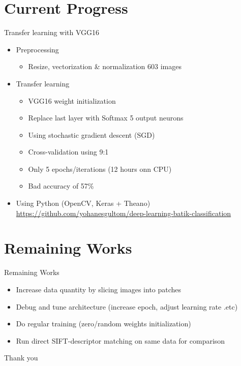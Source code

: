 \documentclass[10pt]{beamer}
\begin{document}
\section{Current Progress}

\begin{frame}{Transfer learning with VGG16}

	\begin{itemize}[<+->]
		\item Preprocessing
		\begin{itemize}
			\item Resize, vectorization \& normalization 603 images
		\end{itemize}
		\item Transfer learning
		\begin{itemize}
			\item VGG16 weight initialization
			\item Replace last layer with Softmax 5 output neurons
			\item Using stochastic gradient descent (SGD)
			\item Cross-validation using 9:1
			\item Only 5 epochs/iterations (12 hours onn CPU)
			\item Bad accuracy of 57\%
		\end{itemize}
		\item Using Python (OpenCV, Keras + Theano) \url{https://github.com/yohanesgultom/deep-learning-batik-classification}
	\end{itemize}

\end{frame}


\section{Remaining Works}

\begin{frame}{Remaining Works}

	\begin{itemize}[<+->]
		\item Increase data quantity by slicing images into patches
		\item Debug and tune architecture (increase epoch, adjust learning rate .etc)
		\item Do regular training (zero/random weights initialization)
		\item Run direct SIFT-descriptor matching on same data for comparison 
	\end{itemize}

\end{frame}

\begin{frame}[allowframebreaks]
  
  
\end{frame}

\begin{frame}[standout]
  Thank you
\end{frame}
\end{document}
